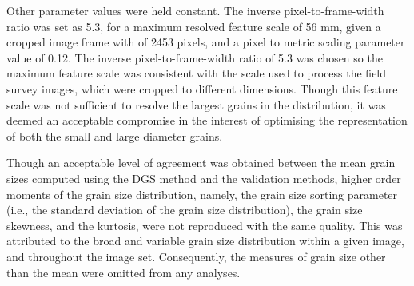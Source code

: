 \documentclass[preprint,12pt,authoryear]{elsarticle}
\begin{document}

Other parameter values were held constant. The inverse pixel-to-frame-width ratio was set as 5.3, for a maximum resolved feature scale of 56 mm, given a cropped image frame with of 2453 pixels, and a pixel to metric scaling parameter value of 0.12. The inverse pixel-to-frame-width ratio of 5.3 was chosen so the maximum feature scale was consistent with the scale used to process the field survey images, which were cropped to different dimensions. Though this feature scale was not sufficient to resolve the largest grains in the distribution, it was deemed an acceptable compromise in the interest of optimising the representation of both the small and large diameter grains.

Though an acceptable level of agreement was obtained between the mean grain sizes computed using the DGS method and the validation methods, higher order moments of the grain size distribution, namely, the grain size sorting parameter (i.e., the standard deviation of the grain size distribution), the grain size skewness, and the kurtosis, were not reproduced with the same quality. This was attributed to the broad and variable grain size distribution within a given image, and throughout the image set. Consequently, the measures of grain size other than the mean were omitted from any analyses.






   




%
%
%
\end{document}
